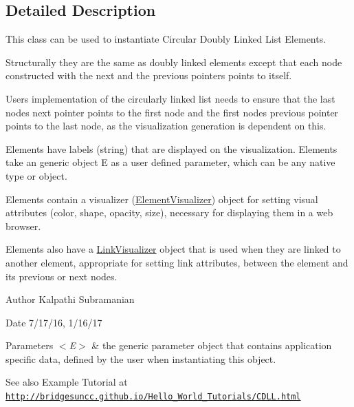 \subsection{Detailed Description}
This class can be used to instantiate Circular Doubly Linked List Elements. 

Structurally they are the same as doubly linked elements except that each node constructed with the next and the previous pointers points to itself.

User\textquotesingle{}s implementation of the circularly linked list needs to ensure that the last node\textquotesingle{}s next pointer points to the first node and the first node\textquotesingle{}s previous pointer points to the last node, as the visualization generation is dependent on this.

Elements have labels (string) that are displayed on the visualization. Elements take an generic object E as a user defined parameter, which can be any native type or object.

Elements contain a visualizer (\mbox{\hyperlink{classbridges_1_1base_1_1_element_visualizer}{Element\+Visualizer}}) object for setting visual attributes (color, shape, opacity, size), necessary for displaying them in a web browser.

Elements also have a \mbox{\hyperlink{classbridges_1_1base_1_1_link_visualizer}{Link\+Visualizer}} object that is used when they are linked to another element, appropriate for setting link attributes, between the element and its previous or next nodes.

\begin{DoxyAuthor}{Author}
Kalpathi Subramanian
\end{DoxyAuthor}
\begin{DoxyDate}{Date}
7/17/16, 1/16/17
\end{DoxyDate}

\begin{DoxyParams}{Parameters}
{\em $<$\+E$>$} & the generic parameter object that contains application specific data, defined by the user when instantiating this object.\\
\hline
\end{DoxyParams}
\begin{DoxySeeAlso}{See also}
Example Tutorial at ~\newline
 \href{http://bridgesuncc.github.io/Hello_World_Tutorials/CDLL.html}{\tt http\+://bridgesuncc.\+github.\+io/\+Hello\+\_\+\+World\+\_\+\+Tutorials/\+C\+D\+L\+L.\+html} 
\end{DoxySeeAlso}


